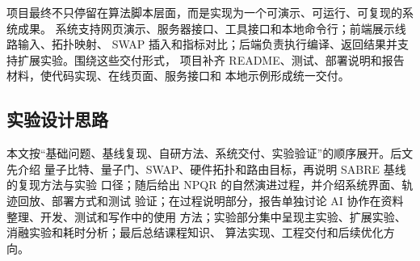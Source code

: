 项目最终不只停留在算法脚本层面，而是实现为一个可演示、可运行、可复现的系统成果。
系统支持网页演示、服务器接口、工具接口和本地命令行；前端展示线路输入、拓扑映射、
SWAP 插入和指标对比；后端负责执行编译、返回结果并支持扩展实验。围绕这些交付形式，
项目补齐 README、测试、部署说明和报告材料，使代码实现、在线页面、服务接口和
本地示例形成统一交付。

\subsection{实验设计思路}

本文按“基础问题、基线复现、自研方法、系统交付、实验验证”的顺序展开。后文先介绍
量子比特、量子门、SWAP、硬件拓扑和路由目标，再说明 SABRE 基线的复现方法与实验
口径；随后给出 NPQR 的自然演进过程，并介绍系统界面、轨迹回放、部署方式和测试
验证；在过程说明部分，报告单独讨论 AI 协作在资料整理、开发、测试和写作中的使用
方法；实验部分集中呈现主实验、扩展实验、消融实验和耗时分析；最后总结课程知识、
算法实现、工程交付和后续优化方向。
